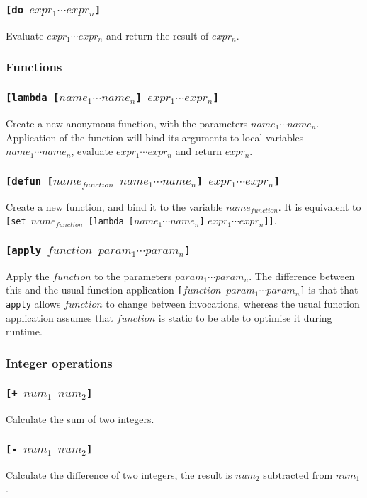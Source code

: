 \documentclass[11pt]{report}
\begin{document}
\subsubsection*{\tt{[do }$expr_1 \cdots expr_n$\tt{]}}
Evaluate $expr_1 \cdots expr_n$ and return the result of $expr_n$.


\subsubsection{Functions}
\subsubsection*{\tt{[lambda [}$name_1 \cdots name_n$\tt{]} $expr_1 \cdots expr_n$\tt{]}}
Create a new anonymous function, with the parameters $name_1\cdots name_n$. Application of the function will bind its arguments to local variables $name_1\cdots name_n$, evaluate $expr_1\cdots expr_n$ and return $expr_n$.
\subsubsection*{\tt{[defun [}$name_{function}$ $name_1 \cdots name_n$\tt{]} $expr_1 \cdots expr_n$\tt{]}}
Create a new function, and bind it to the variable $name_{function}$. It is equivalent to {\tt{[set }}$name_{function}${\tt{ [lambda [}}$name_1 \cdots name_n${\tt{]}} $expr_1 \cdots expr_n${\tt{]]}}.

\subsubsection*{\tt{[apply }$function$ $param_1 \cdots param_n$\tt{]}}
Apply the $function$ to the parameters $param_1\cdots param_n$. The difference between this and the usual function application {\tt{[}$function$ $param_1\cdots param_n$\tt{]}} is that that \verb|apply| allows $function$ to change between invocations, whereas the usual function application assumes that $function$ is static to be able to optimise it during runtime.

\subsubsection{Integer operations}
\subsubsection*{\tt{[+ }$num_1$ $num_2$\tt{]}}
Calculate the sum of two integers.
\subsubsection*{\tt{[- }$num_1$ $num_2$\tt{]}}
Calculate the difference of two integers, the result is $num_2$ subtracted from $num_1$.
\end{document}
